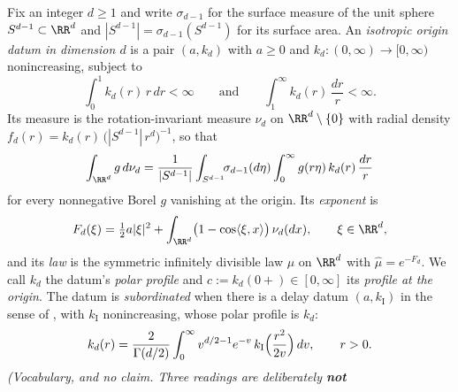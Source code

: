 \begin{definition}
\label{def:isotropic-origin-datum}
\leanok
Fix an integer $d \ge 1$ and write $\sigma_{d-1}$ for the surface measure of the unit sphere
$S^{d-1} \subset \RR^d$ and $|S^{d-1}| = \sigma_{d-1}(S^{d-1})$ for its surface area. An
\emph{isotropic origin datum in dimension $d$} is a pair
$(a, k_d)$ with $a \ge 0$ and $k_d : (0,\infty) \to [0,\infty)$ nonincreasing, subject to
\[
  \int_0^1 k_d(r)\,r\,dr < \infty
  \qquad\text{and}\qquad
  \int_1^\infty k_d(r)\,\frac{dr}{r} < \infty .
\]
Its \Levy{} measure is the rotation-invariant measure $\nu_d$ on $\RR^d \setminus \{0\}$ with radial
density $f_d(r) = k_d(r)\,\bigl(|S^{d-1}|\,r^d\bigr)^{-1}$, so that
\begin{equation}\label{eq:polar-decomposition}
  \int_{\RR^d} g \,d\nu_d
   = \frac{1}{|S^{d-1}|}\int_{S^{d-1}}\!\!\sigma_{d-1}(d\eta)\int_0^\infty g(r\eta)\,k_d(r)\,\frac{dr}{r}
\end{equation}
for every nonnegative Borel $g$ vanishing at the origin. Its \emph{exponent} is
\begin{equation}\label{eq:isotropic-exponent}
  F_d(\xi) = \tfrac12 a|\xi|^2
   + \int_{\RR^d}\bigl(1 - \cos\langle \xi, x\rangle\bigr)\,\nu_d(dx), \qquad \xi \in \RR^d ,
\end{equation}
and its \emph{law} is the symmetric infinitely divisible law $\mu$ on $\RR^d$ with
$\widehat\mu = e^{-F_d}$. We call $k_d$ the datum's \emph{polar profile} and
$c := k_d(0{+}) \in [0,\infty]$ its \emph{profile at the origin}. The datum is
\emph{subordinated} when there is a delay datum $(a, k_{\mathrm I})$ in the sense of
, with $k_{\mathrm I}$ nonincreasing, whose polar profile  is $k_d$:
\begin{equation}\label{eq:polar-profile-d}
  k_d(r) = \frac{2}{\Gamma(d/2)}\int_0^\infty v^{d/2-1}e^{-v}\,
    k_{\mathrm I}\Bigl(\frac{r^2}{2v}\Bigr)\,dv , \qquad r > 0 .
\end{equation}
\statusT\quad\emph{(Vocabulary, and no claim. Three readings are deliberately \textbf{not}
}
\end{definition}
